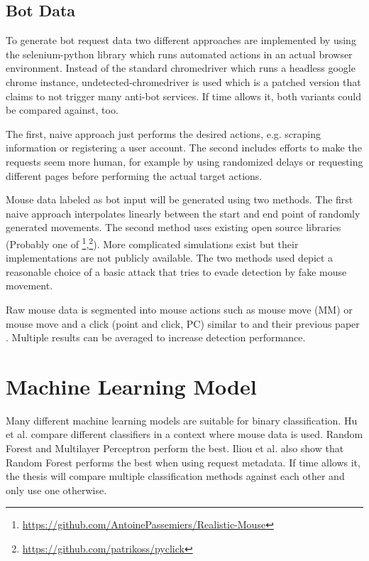 \documentclass[
    fontsize=12pt,
    headings=small,
    parskip=half,           %
    bibliography=totoc,
    numbers=noenddot,       %
    open=any,               %
    final                   %
    ]{scrreprt}
\begin{document}
\subsection{Bot Data}

To generate bot request data two different approaches are implemented by using the selenium-python \cite{SELENIUMPYTHON} library which runs automated actions in an actual browser environment. Instead of the standard chromedriver which runs a headless google chrome instance, undetected-chromedriver \cite{UNDETECTEDCHROMEDRIVER} is used which is a patched version that claims to not trigger many anti-bot services. If time allows it, both variants could be compared against, too.

The first, naive approach just performs the desired actions, e.g. scraping information or registering a user account. The second includes efforts to make the requests seem more human, for example by using randomized delays or requesting different pages before performing the actual target actions.

Mouse data labeled as bot input will be generated using two methods. The first naive approach interpolates linearly between the start and end point of randomly generated movements. The second method uses existing open source libraries (Probably one of \footnote{\url{https://github.com/AntoinePassemiers/Realistic-Mouse}},\footnote{\url{https://github.com/patrikoss/pyclick}}). More complicated simulations exist but their implementations are not publicly available. \cite{8275816} \cite{Nazar2003} The two methods used depict a reasonable choice of a basic attack that tries to evade detection by fake mouse movement.

Raw mouse data is segmented into mouse actions such as mouse move (MM) or mouse move and a click (point and click, PC) similar to \cite{9111596} and their previous paper \cite{DBLP:journals/corr/abs-1810-04668}. Multiple results can be averaged to increase detection performance.


\section{Machine Learning Model}
\label{machine_learning_model}

Many different machine learning models are suitable for binary classification. Hu et al. \cite{8275816} compare different classifiers in a context where mouse data is used. Random Forest and Multilayer Perceptron perform the best.
Iliou et al. \cite{10.1145/3339252.3339267} also show that Random Forest performs the best when using request metadata.
If time allows it, the thesis will compare multiple classification methods against each other and only use one otherwise.
\end{document}

